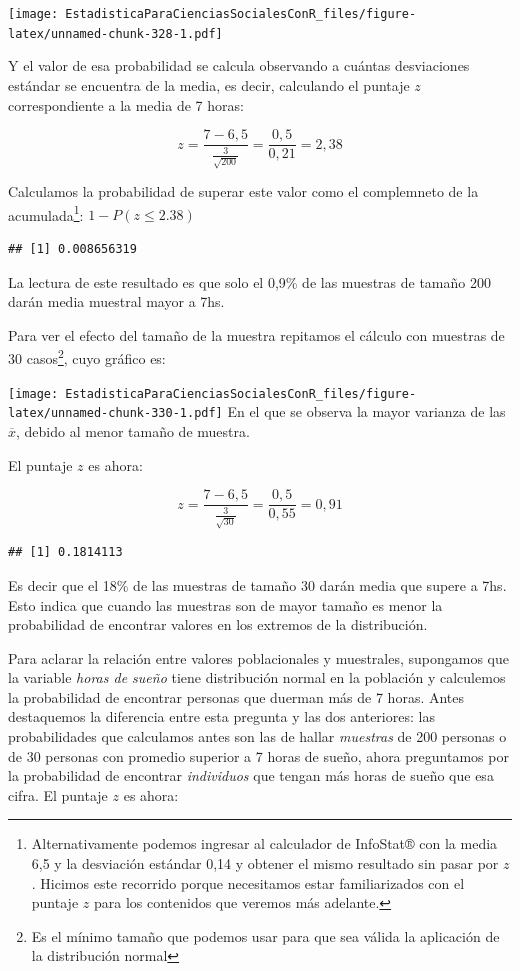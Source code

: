\documentclass[]{book}
\let\rmarkdownfootnote\footnote%
\def\footnote{\protect\rmarkdownfootnote}
\begin{document}
\texttt{[image: EstadisticaParaCienciasSocialesConR\_files/figure-latex/unnamed-chunk-328-1.pdf]}

Y el valor de esa probabilidad se calcula observando a cuántas
desviaciones estándar se encuentra de la media, es decir, calculando el
puntaje \(z\) correspondiente a la media de 7 horas:

\[z = \frac{7 - 6,5}{\frac{3}{\sqrt{200}}} = \frac{0,5}{0,21} = 2,38\]

Calculamos la probabilidad de superar este valor como el complemneto de la acumulada\footnote{Alternativamente podemos ingresar al calculador de InfoStat® con la media 6,5 y la desviación estándar 0,14 y obtener el mismo resultado sin pasar por \(z\). Hicimos este recorrido porque necesitamos estar familiarizados con el puntaje \(z\) para los contenidos que veremos más adelante.}: \(1-P(z\leq 2.38)\)

\begin{verbatim}
## [1] 0.008656319
\end{verbatim}

La lectura de este resultado es que solo el 0,9\% de las muestras de tamaño 200 darán media muestral mayor a 7hs.

Para ver el efecto del tamaño de la muestra repitamos el cálculo con
muestras de 30 casos\footnote{Es el mínimo tamaño que podemos usar para que sea válida la aplicación de la distribución normal}, cuyo gráfico es:

\texttt{[image: EstadisticaParaCienciasSocialesConR\_files/figure-latex/unnamed-chunk-330-1.pdf]}
En el que se observa la mayor varianza de las \(\overline{x}\), debido al menor tamaño de muestra.

El puntaje \(z\) es ahora:

\[z = \frac{7 - 6,5}{\frac{3}{\sqrt{30}}} = \frac{0,5}{0,55} = 0,91\]

\begin{verbatim}
## [1] 0.1814113
\end{verbatim}

Es decir que el 18\% de las muestras de tamaño 30 darán media que supere a 7hs. Esto indica que cuando las muestras son de mayor tamaño es menor la probabilidad de encontrar valores en los extremos de la distribución.

Para aclarar la relación entre valores poblacionales y muestrales, supongamos que la variable \emph{horas de sueño} tiene distribución normal en la población y calculemos la probabilidad de encontrar personas que
duerman más de 7 horas. Antes destaquemos la diferencia entre esta
pregunta y las dos anteriores: las probabilidades que calculamos antes
son las de hallar \emph{muestras} de 200 personas o de 30 personas con
promedio superior a 7 horas de sueño, ahora preguntamos por la
probabilidad de encontrar \emph{individuos} que tengan más horas de sueño que esa cifra. El puntaje \(z\) es ahora:
\end{document}
